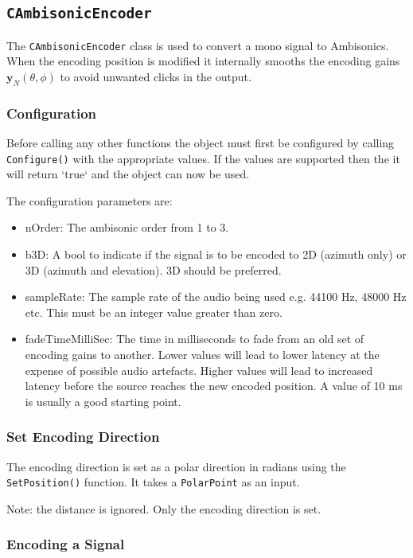 \documentclass[12pt]{report}
\newcommand{\code}[1]{\texttt{#1}}
\begin{document}
\subsection{\code{CAmbisonicEncoder}}

The \code{CAmbisonicEncoder} class is used to convert a mono signal to Ambisonics. When the encoding position is modified it internally smooths the encoding gains $\textbf{y}_{N}(\theta,\phi)$ to avoid unwanted clicks in the output.

\subsubsection{Configuration}

Before calling any other functions the object must first be configured by calling \code{Configure()} with the appropriate values. If the values are supported then the it will return `true` and the object can now be used.

The configuration parameters are:
\begin{itemize}
    \item nOrder: The ambisonic order from 1 to 3.
    \item b3D: A bool to indicate if the signal is to be encoded to 2D (azimuth only) or 3D (azimuth and elevation). 3D should be preferred.
    \item sampleRate: The sample rate of the audio being used e.g. 44100 Hz, 48000 Hz etc. This must be an integer value greater than zero.
    \item fadeTimeMilliSec: The time in milliseconds to fade from an old set of encoding gains to another. Lower values will lead to lower latency at the expense of possible audio artefacts. Higher values will lead to increased latency before the source reaches the new encoded position. A value of 10 ms is usually a good starting point.
\end{itemize}

\subsubsection{Set Encoding Direction}

The encoding direction is set as a polar direction in radians using the \code{SetPosition()} function. It takes a \code{PolarPoint} as an input.

Note: the distance is ignored. Only the encoding direction is set.

\subsubsection{Encoding a Signal}
\end{document}
